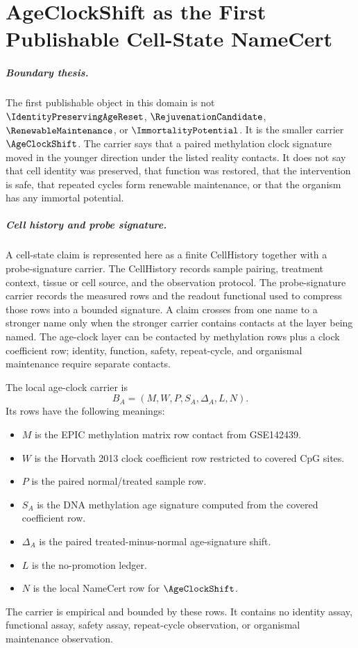 \chapter{AgeClockShift as the First Publishable Cell-State NameCert}
\label{ch:age-clock-shift-no-promotion}

\paragraph{Boundary thesis.}
The first publishable object in this domain is not $\IdentityPreservingAgeReset$, $\RejuvenationCandidate$, $\RenewableMaintenance$, or $\ImmortalityPotential$. It is the smaller carrier $\AgeClockShift$. The carrier says that a paired methylation clock signature moved in the younger direction under the listed reality contacts. It does not say that cell identity was preserved, that function was restored, that the intervention is safe, that repeated cycles form renewable maintenance, or that the organism has any immortal potential.

\paragraph{Cell history and probe signature.}
A cell-state claim is represented here as a finite CellHistory together with a probe-signature carrier. The CellHistory records sample pairing, treatment context, tissue or cell source, and the observation protocol. The probe-signature carrier records the measured rows and the readout functional used to compress those rows into a bounded signature. A claim crosses from one name to a stronger name only when the stronger carrier contains contacts at the layer being named. The age-clock layer can be contacted by methylation rows plus a clock coefficient row; identity, function, safety, repeat-cycle, and organismal maintenance require separate contacts.

\begin{definition}
\label{def:age-clock-carrier}
The local age-clock carrier is
$$
B_A=(M,W,P,S_A,\Delta_A,L,N).
$$
Its rows have the following meanings:
\begin{itemize}[leftmargin=2em]
\item $M$ is the EPIC methylation matrix row contact from GSE142439.
\item $W$ is the Horvath 2013 clock coefficient row restricted to covered CpG sites.
\item $P$ is the paired normal/treated sample row.
\item $S_A$ is the DNA methylation age signature computed from the covered coefficient row.
\item $\Delta_A$ is the paired treated-minus-normal age-signature shift.
\item $L$ is the no-promotion ledger.
\item $N$ is the local NameCert row for $\AgeClockShift$.
\end{itemize}
The carrier is empirical and bounded by these rows. It contains no identity assay, functional assay, safety assay, repeat-cycle observation, or organismal maintenance observation.
\end{definition}

